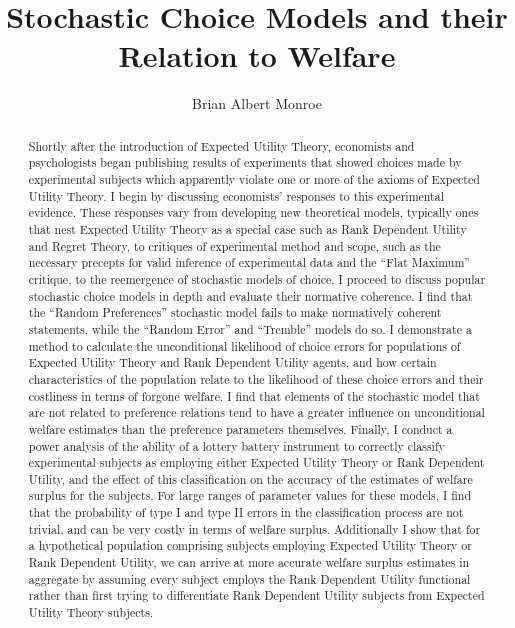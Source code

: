 \documentclass[11pt,a4paper,notitlepage]{report}
\title{Stochastic Choice Models and their Relation to Welfare}
\author{Brian Albert Monroe}
\begin{document}

\doublespacing

\begin{abstract}

Shortly after the introduction of Expected Utility Theory, economists and psychologists began publishing results of experiments that showed choices made by experimental subjects which apparently violate one or more of the axioms of Expected Utility Theory.
I begin by discussing economists' responses to this experimental evidence.
These responses vary from developing new theoretical models, typically ones that nest Expected Utility Theory as a special case such as Rank Dependent Utility and Regret Theory, to critiques of experimental method and scope, such as the necessary precepts for valid inference of experimental data and the \enquote{Flat Maximum} critique, to the reemergence of stochastic models of choice.
I proceed to discuss popular stochastic choice models in depth and evaluate their normative coherence.
I find that the \enquote{Random Preferences} stochastic model fails to make normatively coherent statements, while the \enquote{Random Error} and \enquote{Tremble} models do so.
I demonstrate a method to calculate the unconditional likelihood of choice errors for populations of Expected Utility Theory and Rank Dependent Utility agents, and how certain characteristics of the population relate to the likelihood of these choice errors and their costliness in terms of forgone welfare.
I find that elements of the stochastic model that are not related to preference relations tend to have a greater influence on unconditional welfare estimates than the preference parameters themselves.
Finally, I conduct a power analysis of the ability of a lottery battery instrument to correctly classify experimental subjects as employing either Expected Utility Theory or Rank Dependent Utility, and the effect of this classification on the accuracy of the estimates of welfare surplus for the subjects.
For large ranges of parameter values for these models, I find that the probability of type I and type II errors in the classification process are not trivial, and can be very costly in terms of welfare surplus.
Additionally I show that for a hypothetical population comprising subjects employing Expected Utility Theory or Rank Dependent Utility, we can arrive at more accurate welfare surplus estimates in aggregate by assuming every subject employs the Rank Dependent Utility functional rather than first trying to differentiate Rank Dependent Utility subjects from Expected Utility Theory subjects.

\end{abstract}
\end{document}
